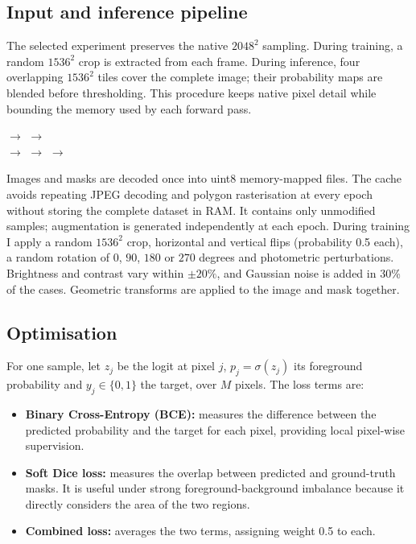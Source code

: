 \subsection{Input and inference pipeline}

The selected experiment preserves the native $2048^2$ sampling. During training, a
random $1536^2$ crop is extracted from each frame. During inference, four overlapping
$1536^2$ tiles cover the complete image; their probability maps are blended before
thresholding. This procedure keeps native pixel detail while bounding the memory used
by each forward pass.

\begin{center}
\small
{}
$\longrightarrow$ 
$\longrightarrow$ \\[0.35em]
$\longrightarrow$ 
$\longrightarrow$ 
$\longrightarrow$ 
\end{center}

Images and masks are decoded once into uint8 memory-mapped files. The cache avoids
repeating JPEG decoding and polygon rasterisation at every epoch without storing the
complete dataset in RAM. It contains only unmodified samples; augmentation is generated
independently at each epoch. During training I apply a random $1536^2$ crop, horizontal
and vertical flips (probability 0.5 each), a random rotation of $0$, $90$, $180$ or
$270$ degrees and photometric perturbations. Brightness and contrast vary within
$\pm20\%$, and Gaussian noise is added in 30\% of the cases. Geometric transforms are
applied to the image and mask together.

\subsection{Optimisation}

For one sample, let $z_j$ be the logit at pixel $j$, $p_j=\sigma(z_j)$ its foreground
probability and $y_j\in\{0,1\}$ the target, over $M$ pixels. The loss terms are:

\begin{samepage}
\begin{itemize}
\item \textbf{Binary Cross-Entropy (BCE):} measures the difference between the
  predicted probability and the target for each pixel, providing local pixel-wise
  supervision.
\item \textbf{Soft Dice loss:} measures the overlap between predicted and ground-truth
  masks. It is useful under strong foreground-background imbalance because it directly
  considers the area of the two regions.
\item \textbf{Combined loss:} averages the two terms, assigning weight 0.5 to each.
\end{itemize}
\end{samepage}

